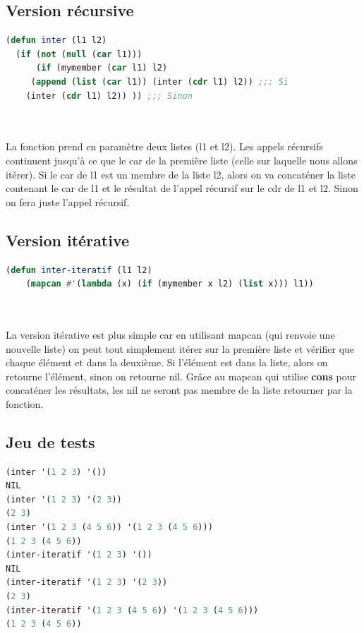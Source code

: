\documentclass[a4paper,10pt]{report}
\begin{document}
    
      \subsection{Version récursive}
	\begin{lstlisting}[language=Lisp]
(defun inter (l1 l2)
  (if (not (null (car l1)))
      (if (mymember (car l1) l2)
	 (append (list (car l1)) (inter (cdr l1) l2)) ;;; Si
	(inter (cdr l1) l2)) )) ;;; Sinon
	
	
	\end{lstlisting}

      La fonction prend en paramètre deux listes (l1 et l2). Les appels récursifs continuent jusqu'à ce que le car de la première liste (celle sur laquelle nous allons itérer).
      Si le car de l1 est un membre de la liste l2, alors on va concaténer la liste contenant le car de l1 et le résultat de l'appel récursif sur le cdr de l1 et l2. Sinon
      on fera juste l'appel récursif. \newline
      
      
      \subsection{Version itérative}
      
	\begin{lstlisting}[language=Lisp]
(defun inter-iteratif (l1 l2)
    (mapcan #'(lambda (x) (if (mymember x l2) (list x))) l1))

    
    \end{lstlisting}

      La version itérative est plus simple car en utilisant mapcan (qui renvoie une nouvelle liste) on peut tout simplement itérer sur la première liste et vérifier que chaque élément et dans la deuxième.
      Si l'élément est dans la liste, alors on retourne l'élément, sinon on retourne nil. Grâce au mapcan qui utilise \textbf{cons} pour concaténer les résultats, les nil ne seront pas membre de la liste retourner par la fonction.
      \vspace{1cm}
	  \subsection{Jeu de tests}
	   \begin{lstlisting}[language=Lisp]
(inter '(1 2 3) '())
NIL	      
(inter '(1 2 3) '(2 3))
(2 3)	   
(inter '(1 2 3 (4 5 6)) '(1 2 3 (4 5 6)))
(1 2 3 (4 5 6))
(inter-iteratif '(1 2 3) '())
NIL	      
(inter-iteratif '(1 2 3) '(2 3))
(2 3)	   
(inter-iteratif '(1 2 3 (4 5 6)) '(1 2 3 (4 5 6)))
(1 2 3 (4 5 6))
		 \end{lstlisting}
\end{document}
